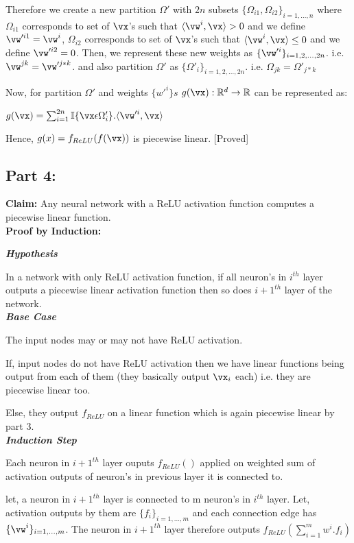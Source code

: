 \documentclass[a4paper,11pt]{article}
\begin{document}
\begin{mlsolution}
Therefore we create a new partition $\Omega'$ with $2n$ subsets $\{\Omega_{i1},\Omega_{i2}\}_{i=1,...,n}$ where $\Omega_{i1}$ corresponds to set of $\vx$'s such that  $\langle \vw^i,\vx\rangle > 0$ and we define $\vw'^{i1} = \vw^i$, $\Omega_{i2}$ corresponds to set of $\vx$'s such that  $\langle \vw^i,\vx\rangle \leq 0$ and we define $\vw'^{i2} = 0$.
Then, we represent these new weights as $\{\vw'^i\}_{i=1,2,...,2n}$. i.e. $\vw^{jk} =\vw'^{j*k} $. and also partition $\Omega'$ as $\{\Omega'_i\}_{i=1,2,...,2n}$. i.e. $\Omega_{jk} =\Omega'_{j*k} $

Now, for partition $\Omega'$ and weights $\{w'^i\}s$ $g(\vx): \mathbb{R}^d \rightarrow \mathbb{R}$ can be represented as:
\begin{center}
$g(\vx) = \sum_{i=1}^{2n}\mathbb{I}\{\vx \epsilon \Omega'_i \}.\langle \vw'^i,\vx\rangle$\\
\end{center}
Hence, $g(x) = f_{ReLU}(f(\vx))$ is piecewise linear. [Proved]

\subsection*{Part 4:}
\textbf{Claim:} Any neural network with a ReLU activation function computes a piecewise linear function.\\
\textbf{Proof by Induction:} 

\textbf{\textit{Hypothesis}}

In a network with only ReLU activation function, if all neuron's in $i^{th}$ layer outputs a piecewise linear activation function then so does $i+1^{th}$ layer of the network.\\
\textbf{\textit{Base Case}}

The input nodes may or may not have ReLU activation. 

If, input nodes do not have ReLU activation then we have linear functions being output from each of them (they basically output $\vx_i$ each) i.e. they are piecewise linear too. 

Else, they output $f_{ReLU}$ on a linear function which is again piecewise linear by part 3.\\
\textbf{\textit{Induction Step}}

Each neuron in $i+1^{th}$ layer ouputs $f_{ReLU}()$ applied on weighted sum of activation outputs of neuron's in previous layer it is connected to.

let, a neuron in $i+1^{th}$ layer is connected to m neuron's in $i^{th}$ layer. Let, activation outputs by them are $\{f_i\}_{i=1,...,m}$ and each connection edge has $\{\vw^i\}_{i=1,...,m}$. The neuron in $i+1^{th}$ layer therefore outputs $f_{ReLU}(\sum_{i=1}^{m}w^i.f_i)$


\end{mlsolution}
\end{document}
